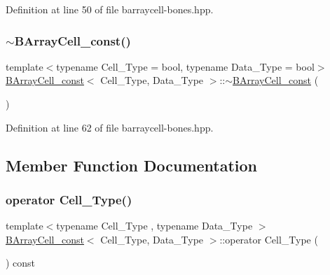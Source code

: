 Definition at line 50 of file barraycell-\/bones.\+hpp.

\mbox{\label{class_b_array_cell__const_a3afb7b09142e1c02c9711d601f532573}} 
\subsubsection{\texorpdfstring{$\sim$\+B\+Array\+Cell\+\_\+const()}{~BArrayCell\_const()}}
{\footnotesize\ttfamily template$<$typename Cell\+\_\+\+Type = bool, typename Data\+\_\+\+Type = bool$>$ \\
\hyperlink{class_b_array_cell__const}{B\+Array\+Cell\+\_\+const}$<$ Cell\+\_\+\+Type, Data\+\_\+\+Type $>$\+::$\sim$\hyperlink{class_b_array_cell__const}{B\+Array\+Cell\+\_\+const} (\begin{DoxyParamCaption}{ }\end{DoxyParamCaption})\hspace{0.3cm}{\ttfamily [inline]}}



Definition at line 62 of file barraycell-\/bones.\+hpp.



\subsection{Member Function Documentation}
\mbox{\label{class_b_array_cell__const_ab5d767055c53b7024380a8011dad698a}} 
\subsubsection{\texorpdfstring{operator Cell\+\_\+\+Type()}{operator Cell\_Type()}}
{\footnotesize\ttfamily template$<$typename Cell\+\_\+\+Type , typename Data\+\_\+\+Type $>$ \\
\hyperlink{class_b_array_cell__const}{B\+Array\+Cell\+\_\+const}$<$ Cell\+\_\+\+Type, Data\+\_\+\+Type $>$\+::operator Cell\+\_\+\+Type (\begin{DoxyParamCaption}{ }\end{DoxyParamCaption}) const\hspace{0.3cm}{\ttfamily [inline]}}



